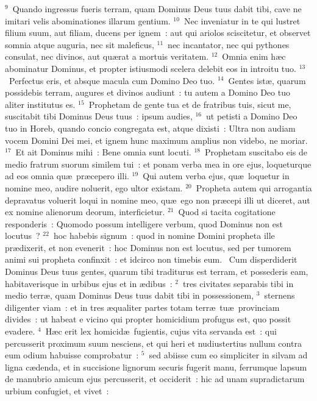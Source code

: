 ${}^{9}$~Quando ingressus fueris terram, quam Dominus Deus tuus dabit tibi, cave ne imitari velis abominationes illarum gentium.
${}^{10}$~Nec inveniatur in te qui lustret filium suum, aut filiam, ducens per ignem~: aut qui ariolos sciscitetur, et observet somnia atque auguria, nec sit maleficus,
${}^{11}$~nec incantator, nec qui pythones consulat, nec divinos, aut qu\ae rat a mortuis veritatem.
${}^{12}$~Omnia enim h\ae c abominatur Dominus, et propter istiusmodi scelera delebit eos in introitu tuo.
${}^{13}$~Perfectus eris, et absque macula cum Domino Deo tuo.
${}^{14}$~Gentes ist\ae , quarum possidebis terram, augures et divinos audiunt~: tu autem a Domino Deo tuo aliter institutus es.
${}^{15}$~Prophetam de gente tua et de fratribus tuis, sicut me, suscitabit tibi Dominus Deus tuus~: ipsum audies,
${}^{16}$~ut petisti a Domino Deo tuo in Horeb, quando concio congregata est, atque dixisti~: Ultra non audiam vocem Domini Dei mei, et ignem hunc maximum amplius non videbo, ne moriar.
${}^{17}$~Et ait Dominus mihi~: Bene omnia sunt locuti.
${}^{18}$~Prophetam suscitabo eis de medio fratrum suorum similem tui~: et ponam verba mea in ore ejus, loqueturque ad eos omnia qu\ae\ pr\ae cepero illi.
${}^{19}$~Qui autem verba ejus, qu\ae\ loquetur in nomine meo, audire noluerit, ego ultor existam.
${}^{20}$~Propheta autem qui arrogantia depravatus voluerit loqui in nomine meo, qu\ae\ ego non pr\ae cepi illi ut diceret, aut ex nomine alienorum deorum, interficietur.
${}^{21}$~Quod si tacita cogitatione responderis~: Quomodo possum intelligere verbum, quod Dominus non est locutus~?
${}^{22}$~hoc habebis signum~: quod in nomine Domini propheta ille pr\ae dixerit, et non evenerit~: hoc Dominus non est locutus, sed per tumorem animi sui propheta confinxit~: et idcirco non timebis eum.
~Cum disperdiderit Dominus Deus tuus gentes, quarum tibi traditurus est terram, et possederis eam, habitaverisque in urbibus ejus et in \ae dibus~:
${}^{2}$~tres civitates separabis tibi in medio terr\ae , quam Dominus Deus tuus dabit tibi in possessionem,
${}^{3}$~sternens diligenter viam~: et in tres \ae qualiter partes totam terr\ae\ tu\ae\ provinciam divides~: ut habeat e vicino qui propter homicidium profugus est, quo possit evadere.
${}^{4}$~H\ae c erit lex homicid\ae\ fugientis, cujus vita servanda est~: qui percusserit proximum suum nesciens, et qui heri et nudiustertius nullum contra eum odium habuisse comprobatur~:
${}^{5}$~sed abiisse cum eo simpliciter in silvam ad ligna c\ae denda, et in succisione lignorum securis fugerit manu, ferrumque lapsum de manubrio amicum ejus percusserit, et occiderit~: hic ad unam supradictarum urbium confugiet, et vivet~:
